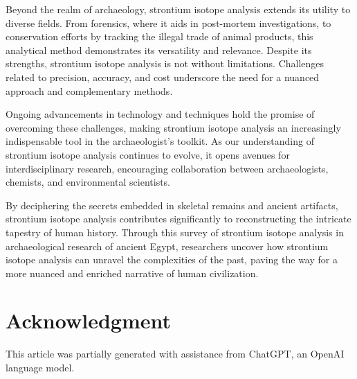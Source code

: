 \documentclass[a4paper, 12pt]{article}
\begin{document}
Beyond the realm of archaeology, strontium isotope analysis extends its utility
to diverse fields. From forensics, where it aids in post-mortem investigations,
to conservation efforts by tracking the illegal trade of animal products, this
analytical method demonstrates its versatility and relevance.
Despite its strengths, strontium isotope analysis is not without
limitations. Challenges related to precision, accuracy, and cost underscore the
need for a nuanced approach and complementary methods.

Ongoing advancements in technology and techniques hold the
promise of overcoming these challenges, making strontium isotope analysis an
increasingly indispensable tool in the archaeologist's toolkit. As our
understanding of strontium isotope analysis continues to evolve, it opens
avenues for interdisciplinary research, encouraging collaboration between
archaeologists, chemists, and environmental scientists.

By deciphering the secrets embedded in skeletal remains and ancient artifacts,
strontium isotope analysis contributes significantly to reconstructing the
intricate tapestry of human history. Through this survey of strontium isotope
analysis in archaeological research of ancient Egypt, researchers uncover how
strontium isotope analysis can unravel the complexities of the past,
paving the way for a more nuanced and enriched narrative of human civilization.

\section{Acknowledgment}

This article was partially generated with assistance from ChatGPT, an OpenAI language model.



\end{document}
